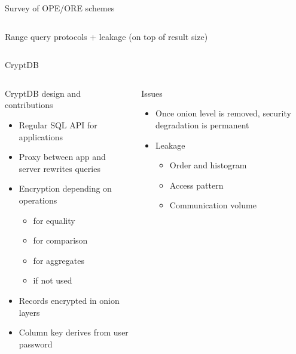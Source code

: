 \begin{frame}{Survey of OPE/ORE schemes~\cite{ore-benchmark-17}}
\begin{columns}[T,onlytextwidth]
\begin{block}{Range query protocols + leakage (on top of result size)}
					\end{block}

			\end{columns}

		\end{frame}

		\begin{frame}{CryptDB~\cite{crypt-db}}

			\begin{columns}[T,onlytextwidth]

					\begin{block}{CryptDB design and contributions}

						\begin{itemize}
							\item Regular SQL API for applications
							\item Proxy between app and server rewrites queries
							\item Encryption depending on operations
							\begin{small}
								\begin{itemize}
									\item {} for equality
									\item {} for comparison
									\item {} for aggregates
									\item {} if not used
								\end{itemize}
							\end{small}
							\item Records encrypted in onion layers
							\item Column key derives from user password
						\end{itemize}

					\end{block}


					\begin{block}{Issues}

						\begin{itemize}
							\item Once onion level is removed, security degradation is permanent
							\item Leakage
							\begin{itemize}
								\item Order and histogram
								\item Access pattern
								\item Communication volume
							\end{itemize}
						\end{itemize}

					\end{block}

			\end{columns}

		\end{frame}

